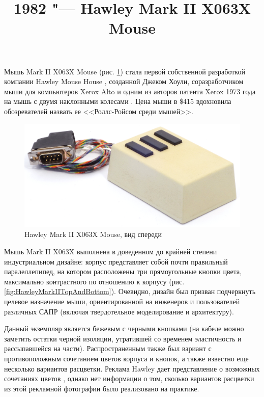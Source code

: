 \documentclass[11pt, a4paper]{article}
\begin{document}
\title{1982 "--- Hawley Mark II X063X Mouse}
\date{}
\maketitle
{}
Мышь Mark II X063X Mouse (рис. \ref{fig:HawleyMarkIIPic}) стала первой собственной разработкой компании Hawley Mouse House \cite{hawley,mouses}, созданной Джеком Хоули, соразработчиком мыши для компьютеров Xerox Alto и одним из авторов патента Xerox 1973 года на мышь с двумя наклонными колесами \cite{pat}. Цена мыши в \$415 \cite{buxton} вдохновила обозревателей назвать ее <<Роллс-Ройсом среди мышей>>.

\begin{figure}[h]
   \centering
    \includegraphics[scale=0.6]{1982_hawley_mark_ii/pic_60.jpg}
    \caption{Hawley Mark II X063X Mouse, вид спереди}
    \label{fig:HawleyMarkIIPic}
\end{figure}

Мышь Mark II X063X выполнена в доведенном до крайней степени индустриальном дизайне: корпус представляет собой почти правильный паралеллепипед, на котором расположены три прямоугольные кнопки цвета, максимально контрастного по отношению к корпусу (рис. \ref{fig:HawleyMarkIITopAndBottom}). Очевидно, дизайн был призван подчеркнуть целевое назначение мыши, ориентированной на инженеров и пользователей различных САПР (включая твердотельное моделирование и архитектуру).

Данный экземпляр является бежевым с черными кнопками (на кабеле можно заметить остатки черной изоляции, утратившей со временем эластичность и рассыпавшейся на части). Распространенным также был вариант с противоположным сочетанием цветов корпуса и кнопок, а также известно еще несколько вариантов расцветки. Реклама Hawley дает представление о возможных сочетаниях цветов \cite{brochure}, однако нет информации о том, сколько вариантов расцветки из этой рекламной фотографии было реализовано на практике.
\end{document}
